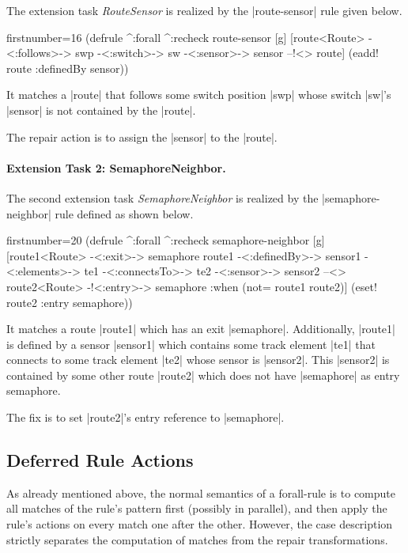 \documentclass[submission]{eptcs}
\newcommand{\code}{\clojureinline}
\begin{document}
The extension task \emph{RouteSensor} is realized by the \code|route-sensor|
rule given below.

\begin{clojurecode*}{firstnumber=16}
(defrule ^:forall ^:recheck route-sensor [g]
  [route<Route> -<:follows>-> swp -<:switch>-> sw
   -<:sensor>-> sensor --!<> route]
  (eadd! route :definedBy sensor))
\end{clojurecode*}

It matches a \code|route| that follows some switch position \code|swp| whose
switch \code|sw|'s \code|sensor| is not contained by the \code|route|.

The repair action is to assign the \code|sensor| to the \code|route|.


\paragraph{Extension Task 2: SemaphoreNeighbor.}

The second extension task \emph{SemaphoreNeighbor} is realized by the
\code|semaphore-neighbor| rule defined as shown below.

\begin{clojurecode*}{firstnumber=20}
(defrule ^:forall ^:recheck semaphore-neighbor [g]
  [route1<Route> -<:exit>-> semaphore
   route1 -<:definedBy>-> sensor1 -<:elements>-> te1
   -<:connectsTo>-> te2 -<:sensor>-> sensor2
   --<> route2<Route> -!<:entry>-> semaphore
   :when (not= route1 route2)]
  (eset! route2 :entry semaphore))
\end{clojurecode*}

It matches a route \code|route1| which has an exit \code|semaphore|.
Additionally, \code|route1| is defined by a sensor \code|sensor1| which
contains some track element \code|te1| that connects to some track element
\code|te2| whose sensor is \code|sensor2|.  This \code|sensor2| is contained by
some other route \code|route2| which does not have \code|semaphore| as entry
semaphore.

The fix is to set \code|route2|'s entry reference to \code|semaphore|.


\subsection{Deferred Rule Actions}
\label{sec:deferred-actions}

As already mentioned above, the normal semantics of a forall-rule is to compute
all matches of the rule's pattern first (possibly in parallel), and then apply
the rule's actions on every match one after the other.  However, the case
description strictly separates the computation of matches from the repair
transformations.
\end{document}
